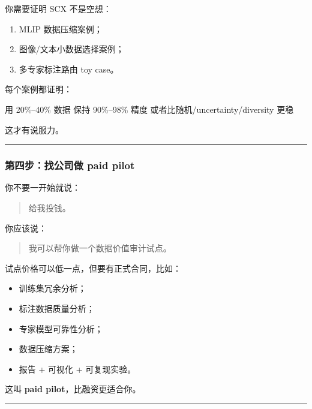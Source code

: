 \documentclass[
  12pt,
]{ctexart}
\newenvironment{Shaded}{}{}
\newcommand{\NormalTok}[1]{#1}
\providecommand{\tightlist}{%
  \setlength{\itemsep}{0pt}\setlength{\parskip}{0pt}}
\begin{document}
你需要证明 SCX 不是空想：

\begin{enumerate}
\def\labelenumi{\arabic{enumi}.}
\tightlist
\item
  MLIP 数据压缩案例；
\item
  图像/文本小数据选择案例；
\item
  多专家标注路由 toy case。
\end{enumerate}

每个案例都证明：

\begin{Shaded}
\begin{Highlighting}[]
\NormalTok{用 20\%–40\% 数据}
\NormalTok{保持 90\%–98\% 精度}
\NormalTok{或者比随机/uncertainty/diversity 更稳}
\end{Highlighting}
\end{Shaded}

这才有说服力。

\begin{center}\rule{0.5\linewidth}{0.5pt}\end{center}

\subsubsection{第四步：找公司做 paid
pilot}\label{ux7b2cux56dbux6b65ux627eux516cux53f8ux505a-paid-pilot}

你不要一开始就说：

\begin{quote}
给我投钱。
\end{quote}

你应该说：

\begin{quote}
我可以帮你做一个数据价值审计试点。
\end{quote}

试点价格可以低一点，但要有正式合同，比如：

\begin{itemize}
\tightlist
\item
  训练集冗余分析；
\item
  标注数据质量分析；
\item
  专家模型可靠性分析；
\item
  数据压缩方案；
\item
  报告 + 可视化 + 可复现实验。
\end{itemize}

这叫 \textbf{paid pilot}，比融资更适合你。

\begin{center}\rule{0.5\linewidth}{0.5pt}\end{center}
\end{document}
